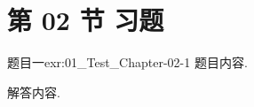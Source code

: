 \section{第 02 节 习题}


\begin{exercise}{题目一}{exr:01_Test_Chapter-02-1}
    题目内容.
\end{exercise}

\begin{solution}
    解答内容.
\end{solution}
